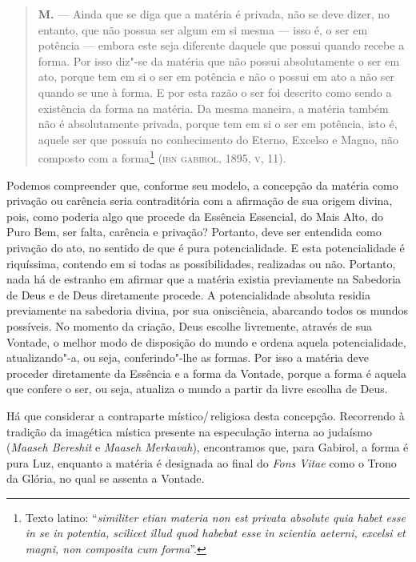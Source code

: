 \begin{quote}
\textbf{M.} --- Ainda que se diga que a matéria é privada, não se deve
dizer, no entanto, que não possua ser algum em si mesma --- isso é, o
ser em potência --- embora este seja diferente daquele que possui
quando recebe a forma. Por isso diz"-se da matéria que não possui
absolutamente o ser em ato, porque tem em si o ser em potência e não
o possui em ato a não ser quando se une à forma. E por esta razão o
ser foi descrito como sendo a existência da forma na matéria. Da
mesma maneira, a matéria também não é absolutamente privada, porque
tem em si o ser em potência, isto é, aquele ser que possuía no
conhecimento do Eterno, Excelso e Magno, não composto com a
forma\footnote{ Texto latino: “\emph{similiter etian materia non
est privata absolute quia habet esse in se in potentia, scilicet
illud quod habebat esse in scientia aeterni, excelsi et magni, non
composita cum forma}”.} (\textsc{ibn} \textsc{gabirol}, 1895,
\textsc{v}, 11).
\end{quote}

Podemos compreender que, conforme seu modelo, a concepção da matéria
como privação ou carência seria contraditória com a afirmação de sua
origem divina, pois, como poderia algo que procede da Essência
Essencial, do Mais Alto, do Puro Bem, ser falta, carência e
privação?
Portanto, deve ser entendida como privação do ato, no sentido de que
é pura potencialidade. E esta potencialidade é riquíssima, contendo
em si todas as possibilidades, realizadas ou não. Portanto, nada há
de estranho em afirmar que a matéria existia previamente na
Sabedoria
de Deus e de Deus diretamente procede. A potencialidade absoluta
residia previamente na sabedoria divina, por sua onisciência,
abarcando todos os mundos possíveis. No momento da criação, Deus
escolhe livremente, através de sua Vontade, o melhor modo de
disposição do mundo e ordena aquela potencialidade, atualizando"-a,
ou
seja, conferindo"-lhe as formas. Por isso a matéria deve proceder
diretamente da Essência e a forma da Vontade, porque a forma é
aquela
que confere o ser, ou seja, atualiza o mundo a partir da livre
escolha de Deus.

Há que considerar a contraparte místico/\,religiosa desta
concepção.
Recorrendo à tradição da imagética mística presente na especulação
interna ao judaísmo (\emph{Maaseh Bereshit} e\emph{ Maaseh
Merkavah}), encontramos que, para Gabirol, a forma é pura Luz,
enquanto a matéria é designada ao final do \emph{Fons Vitae} como
o
Trono da Glória, no qual se assenta a Vontade.

